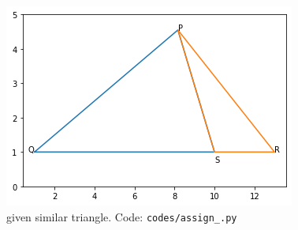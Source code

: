 \documentclass[journal,12pt,twocolumn]{IEEEtran}
\begin{document}
\begin{figure}[!ht]
\centering
\includegraphics[width=\columnwidth]{download.png}
\caption{given similar triangle. 
Code: \texttt{codes/assign{\_}.py}}
\label{fig:triangle}
\end{figure}
\end{document}
